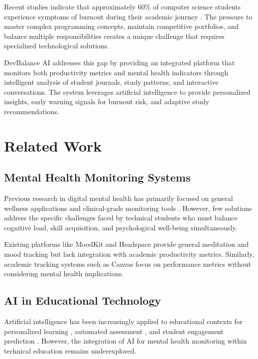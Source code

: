 \documentclass[conference,10pt]{IEEEtran}
\begin{document}
Recent studies indicate that approximately 60\% of computer science students experience symptoms of burnout during their academic journey \cite{brown2021}. The pressure to master complex programming concepts, maintain competitive portfolios, and balance multiple responsibilities creates a unique challenge that requires specialized technological solutions.

DevBalance AI addresses this gap by providing an integrated platform that monitors both productivity metrics and mental health indicators through intelligent analysis of student journals, study patterns, and interactive conversations. The system leverages artificial intelligence to provide personalized insights, early warning signals for burnout risk, and adaptive study recommendations.

\section{Related Work}

\subsection{Mental Health Monitoring Systems}

Previous research in digital mental health has primarily focused on general wellness applications \cite{wang2020} and clinical-grade monitoring tools \cite{liu2018}. However, few solutions address the specific challenges faced by technical students who must balance cognitive load, skill acquisition, and psychological well-being simultaneously.

Existing platforms like MoodKit \cite{davis2017} and Headspace \cite{miller2019} provide general meditation and mood tracking but lack integration with academic productivity metrics. Similarly, academic tracking systems such as Canvas \cite{thompson2020} focus on performance metrics without considering mental health implications.

\subsection{AI in Educational Technology}

Artificial intelligence has been increasingly applied to educational contexts for personalized learning \cite{chen2021}, automated assessment \cite{garcia2020}, and student engagement prediction \cite{anderson2019}. However, the integration of AI for mental health monitoring within technical education remains underexplored.
\end{document}

